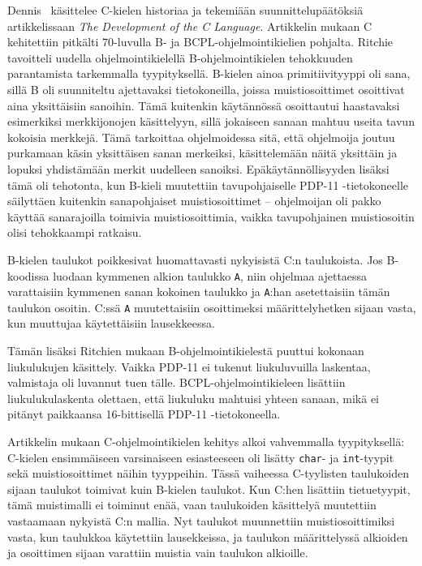 Dennis~\citet{chistory} käsittelee C-kielen historiaa ja tekemiään
suunnittelupäätöksiä artikkelissaan \emph{The Development of the C Language}.
Artikkelin mukaan C kehitettiin pitkälti 70-luvulla B- ja
BCPL-ohjelmointikielien pohjalta. Ritchie tavoitteli uudella
ohjelmointikielellä B-ohjelmointikielen tehokkuuden parantamista tarkemmalla
tyypityksellä. B-kielen ainoa primitiivityyppi oli sana, sillä B oli suunniteltu ajettavaksi
tietokoneilla, joissa muistiosoittimet osoittivat aina yksittäisiin sanoihin.
Tämä kuitenkin käytännössä osoittautui haastavaksi esimerkiksi merkkijonojen
käsittelyyn, sillä jokaiseen sanaan mahtuu useita tavun kokoisia merkkejä. Tämä
tarkoittaa ohjelmoidessa sitä, että ohjelmoija joutuu purkamaan käsin
yksittäisen sanan merkeiksi, käsittelemään näitä yksittäin ja lopuksi
yhdistämään merkit uudelleen sanoiksi. Epäkäytännöllisyyden lisäksi tämä oli
tehotonta, kun B-kieli muutettiin tavupohjaiselle PDP-11 -tietokoneelle
säilyttäen kuitenkin sanapohjaiset muistiosoittimet -- ohjelmoijan oli pakko
käyttää sanarajoilla toimivia muistiosoittimia, vaikka tavupohjainen
muistiosoitin olisi tehokkaampi ratkaisu.

B-kielen taulukot poikkesivat huomattavasti nykyisistä C:n taulukoista. Jos
B\hyp{}koodissa luodaan kymmenen alkion taulukko \texttt{A}, niin ohjelmaa
ajettaessa varattaisiin kymmenen sanan kokoinen taulukko ja \texttt{A}:han
asetettaisiin tämän taulukon osoitin. C:ssä \texttt{A} muutettaisiin
osoittimeksi määrittelyhetken sijaan vasta, kun muuttujaa käytettäisiin
lausekkeessa.

Tämän lisäksi Ritchien mukaan B-ohjelmointikielestä puuttui kokonaan
liukulukujen käsittely. Vaikka PDP-11 ei tukenut liukuluvuilla laskentaa,
valmistaja oli luvannut tuen tälle. BCPL-ohjelmointikieleen lisättiin
liukulukulaskenta olettaen, että liukuluku mahtuisi yhteen sanaan, mikä ei
pitänyt paikkaansa 16-bittisellä PDP-11 -tietokoneella.

Artikkelin mukaan C-ohjelmointikielen kehitys alkoi vahvemmalla tyypityksellä:
C-kielen ensimmäiseen varsinaiseen esiasteeseen oli lisätty \texttt{char}- ja
\texttt{int}-tyypit sekä muistiosoittimet näihin tyyppeihin. Tässä vaiheessa
C-tyylisten taulukoiden sijaan taulukot toimivat kuin B-kielen taulukot. Kun
C:hen lisättiin tietuetyypit, tämä muistimalli ei toiminut enää, vaan
taulukoiden käsittelyä muutettiin vastaamaan nykyistä C:n mallia. Nyt taulukot
muunnettiin muistiosoittimiksi vasta, kun taulukkoa käytettiin lausekkeissa, ja
taulukon määrittelyssä alkioiden ja osoittimen sijaan varattiin muistia vain
taulukon alkioille.


